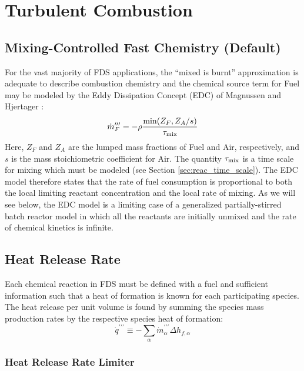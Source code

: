\section{Turbulent Combustion}

\subsection{Mixing-Controlled Fast Chemistry (Default)}
\label{sec:fastchemistry}

For the vast majority of FDS applications, the ``mixed is burnt'' approximation is adequate to describe combustion chemistry and the chemical source term for Fuel may be modeled by the Eddy Dissipation Concept (EDC) of Magnussen and Hjertager \cite{Magnussen:1,Poinsot:TNC}:
\begin{equation}
\label{eq:edc}
\dot{m}_F^{\prime\prime\prime} = -\rho \frac{\min(Z_F, Z_A/s)}{\tau_{\rm mix}}
\end{equation}
Here, $Z_F$ and $Z_A$ are the lumped mass fractions of Fuel and Air, respectively, and $s$ is the mass stoichiometric coefficient for Air.  The quantity $\tau_{\rm mix}$ is a time scale for mixing which must be modeled (see Section \ref{sec:reac_time_scale}).  The EDC model therefore states that the rate of fuel consumption is proportional to both the local limiting reactant concentration and the local rate of mixing. As we will see below, the EDC model is a limiting case of a generalized partially-stirred batch reactor model in which all the reactants are initially unmixed and the rate of chemical kinetics is infinite.


\subsection{Heat Release Rate}
\label{sec:hrr}

Each chemical reaction in FDS must be defined with a fuel and sufficient information such that a heat of formation is known for each participating species. The heat release per unit volume is found by summing the species mass production rates by the respective species heat of formation:
\begin{equation}\label{eq:vol_heat_gen}
\dot{q}^{\prime\prime\prime} \equiv -\displaystyle \sum_{\alpha} \dot{m}^{\prime\prime\prime}_{\alpha} \Delta h_{f,\alpha}
\end{equation}

\subsubsection{Heat Release Rate Limiter}

